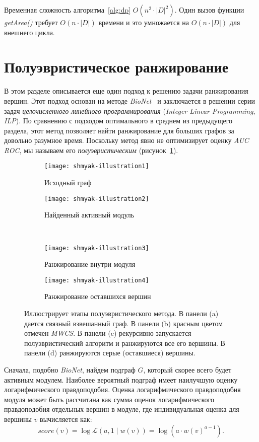 Временная сложность алгоритма~\ref{alg:dp} $O(n^2 \cdot |D|^2)$.  Один вызов
функции \emph{getArea()} требует $O(n \cdot |D|)$ времени и это умножается на
$O(n \cdot |D|)$ для внешнего цикла. 





\section{Полуэвристическое ранжирование}
\label{sec_semiheuristic}

В этом разделе описывается еще один подход к решению задачи ранжирования
вершин.  Этот подход основан на методе \emph{BioNet}~\cite{Dittrich2008a}
и заключается в решении серии задач \emph{целочисленного линейного
программирования} (\emph{Integer Linear Programming}, \emph{ILP}). По сравнению
с подходом оптимального в среднем из предыдущего раздела, этот метод позволяет
найти ранжирование для больших графов за довольно разумное время.  Поскольку
метод явно не оптимизирует оценку \emph{AUC ROC}, мы называем его
\emph{полуэвристическим} (рисунок~\ref{fig:shranking}).
\begin{figure}
    \begin{subfigure}{.5\textwidth}
        \centering
        \texttt{[image: shmyak-illustration1]}
        \caption{Исходный граф} 
    \end{subfigure}%
    \begin{subfigure}{.5\textwidth}
        \centering
        \texttt{[image: shmyak-illustration2]}
        \caption{Найденный активный модуль}
    \end{subfigure}\\[1ex]
    \begin{subfigure}{.5\textwidth}
        \centering
        \texttt{[image: shmyak-illustration3]}
        \caption{Ранжирование внутри модуля}
    \end{subfigure}%
    \begin{subfigure}{.5\textwidth}
        \centering
        \texttt{[image: shmyak-illustration4]}
        \caption{Ранжирование оставшихся вершин}
    \end{subfigure}
    \centering
    \caption{
        Иллюстрирует этапы полуэвристического метода.  В панели (a) дается
        связный взвешанный граф.  В панели (b) красным цветом отмечен \emph{MWCS}.
        В панели (c) рекурсивно запускается полуэвристический алгоритм
        и ранжируются все его вершины.  В панели (d) ранжируются серые
        (оставшиеся) вершины.
    }%
    \label{fig:shranking}%
\end{figure}
Сначала, подобно \emph{BioNet}, найдем подграф $G$, который скорее всего будет
активным модулем.  Наиболее вероятный подграф имеет наилучшую оценку
логарифмического правдоподобия.  Оценка логарифмического правдоподобия модуля
может быть рассчитана как сумма оценок логарифмического правдоподобия отдельных
вершин в модуле, где индивидуальная оценка для вершины $v$ вычисляется как: \[
    score(v) = \log \mathcal{L} (a, 1 \mid w(v)) = \log(a \cdot {w(v)}^{a - 1}).\]


